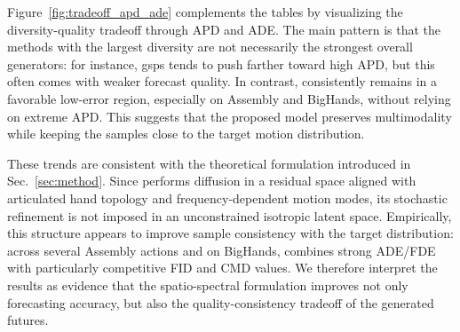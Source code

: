 Figure~\ref{fig:tradeoff_apd_ade} complements the tables by visualizing the diversity-quality tradeoff through APD and ADE. The main pattern is that the methods with the largest diversity are not necessarily the strongest overall generators: for instance, gsps tends to push farther toward high APD, but this often comes with weaker forecast quality. In contrast, \modelname{} consistently remains in a favorable low-error region, especially on Assembly and BigHands, without relying on extreme APD. This suggests that the proposed model preserves multimodality while keeping the samples close to the target motion distribution.

These trends are consistent with the theoretical formulation introduced in Sec.~\ref{sec:method}. Since \modelname{} performs diffusion in a residual space aligned with articulated hand topology and frequency-dependent motion modes, its stochastic refinement is not imposed in an unconstrained isotropic latent space. Empirically, this structure appears to improve sample consistency with the target distribution: across several Assembly actions and on BigHands, \modelname{} combines strong ADE/FDE with particularly competitive FID and CMD values. We therefore interpret the results as evidence that the spatio-spectral formulation improves not only forecasting accuracy, but also the quality-consistency tradeoff of the generated futures.

